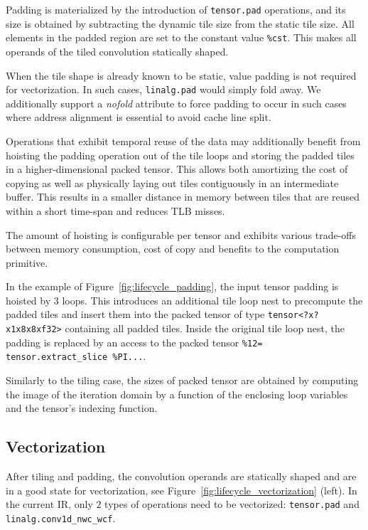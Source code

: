 Padding is materialized by the introduction of \lstinline{tensor.pad} operations, and its size is obtained by subtracting the dynamic tile size from the static tile size. 
All elements in the padded region are set to the constant value \lstinline[mathescape]!%cst!. 
This makes all operands of the tiled convolution statically shaped.

When the tile shape is already known to be static, value padding is not required for vectorization. In such cases, \lstinline|linalg.pad| would
simply fold away.
We additionally support a \emph{nofold} attribute to force padding to 
occur in such cases where address alignment is essential to avoid cache line split.

Operations that exhibit temporal reuse of the data may additionally
benefit from hoisting the padding operation out of the tile loops and storing the padded tiles in a higher-dimensional packed tensor. This allows both
amortizing the cost of copying as well as physically laying out tiles
contiguously in an intermediate buffer. This results in a smaller distance in memory between tiles that are reused within a short time-span
and reduces TLB misses.

The amount of hoisting is configurable per tensor and exhibits various
trade-offs between memory consumption, cost of copy and benefits to the 
computation primitive.

In the example of Figure~\ref{fig:lifecycle_padding}, the input tensor padding is hoisted by $3$ loops. 
This introduces an additional tile loop nest to precompute the padded tiles and insert them into the packed tensor of type \lstinline|tensor<?x?x1x8x8xf32>| containing all padded tiles.
Inside the original tile loop nest, the padding is replaced by an access to the packed tensor \lstinline|%12= tensor.extract_slice %PI...|.

Similarly to the tiling case, the sizes of packed tensor are obtained by computing the image of the iteration domain by a function of the enclosing loop variables and the tensor's indexing function.

\subsection{Vectorization}
\label{subsec:vectorization}

After tiling and padding, the convolution operands are statically shaped and are in a good state for vectorization, see Figure~\ref{fig:lifecycle_vectorization} (left).
In the current IR, only $2$ types of operations need to be
vectorized: \lstinline|tensor.pad| and 
\lstinline|linalg.conv1d_nwc_wcf|.


